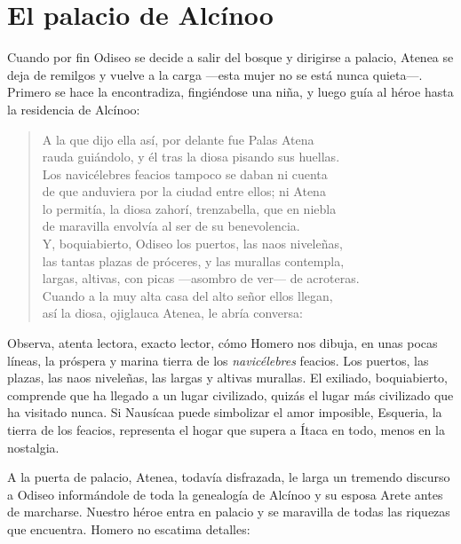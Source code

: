 \label{cap:esqueria}

\section*{El palacio de Alcínoo}

Cuando por fin Odiseo se decide a salir del bosque y dirigirse a palacio, Atenea se deja de remilgos y vuelve a la carga ---esta mujer no se está nunca quieta---. Primero se hace la encontradiza, fingiéndose una niña, y luego guía al héroe hasta la residencia de Alcínoo:

\begin{verse}
A la que dijo ella así, por delante fue Palas Atena\\
rauda guiándolo, y él tras la diosa pisando sus huellas.\\
Los navicélebres feacios tampoco se daban ni cuenta\\
de que anduviera por la ciudad entre ellos; ni Atena\\
lo permitía, la diosa zahorí, trenzabella, que en niebla\\
de maravilla envolvía al ser de su benevolencia.\\
Y, boquiabierto, Odiseo los puertos, las naos niveleñas,\\
las tantas plazas de próceres, y las murallas contempla,\\
largas, altivas, con picas ---asombro de ver--- de acroteras.\\
Cuando a la muy alta casa del alto señor ellos llegan,\\
así la diosa, ojiglauca Atenea, le abría conversa:
\end{verse}

Observa, atenta lectora, exacto lector, cómo Homero nos dibuja, en unas pocas líneas, la próspera y marina tierra de los \emph{navicélebres} feacios. Los puertos, las plazas, las naos niveleñas, las largas y altivas murallas. El exiliado, boquiabierto, comprende que ha llegado a un lugar civilizado, quizás el lugar más civilizado que ha visitado nunca. Si Nausícaa puede simbolizar el amor imposible, Esqueria, la tierra de los feacios, representa el hogar que supera a Ítaca en todo, menos en la nostalgia.

A la puerta de palacio, Atenea, todavía disfrazada, le larga un tremendo discurso a Odiseo informándole de toda la genealogía de Alcínoo y su esposa Arete antes de marcharse. Nuestro héroe entra en palacio y se maravilla de todas las riquezas que encuentra. Homero no escatima detalles:

